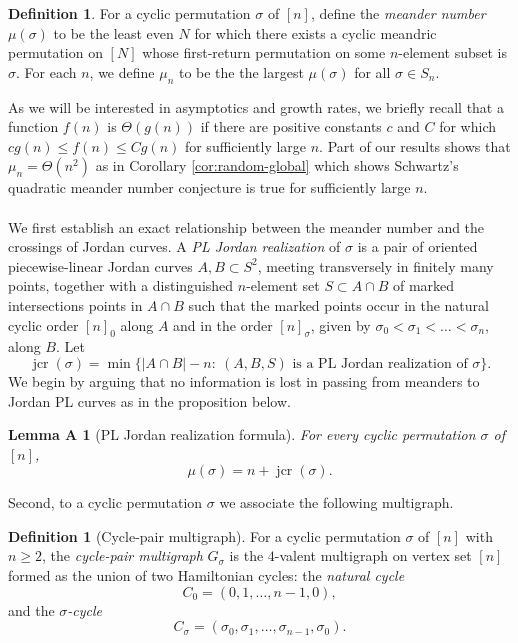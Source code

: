\documentclass[11pt,a4paper]{amsart}
\newtheorem*{mainformula}{Lemma A}
\theoremstyle{definition}
\newtheorem{definition}[theorem]{Definition}
\theoremstyle{remark}
\DeclareMathOperator{\jcr}{jcr}
\begin{document}
\begin{definition}\label{def:meander_number}
For a cyclic permutation $\sigma$ of $[n]$, define the \emph{meander number} $\mu(\sigma)$ to be the least even $N$ for which there exists a cyclic meandric permutation on $[N]$ whose first-return permutation on some $n$-element subset is $\sigma$.  For each $n$, we define $\mu_{n}$ to be the the largest $\mu(\sigma)$ for all $\sigma \in S_{n}$. 
\end{definition}
%
As we will be interested in asymptotics and growth rates, we briefly recall that a function $f(n)$ is $\Theta(g(n))$ if there are positive constants $c$ and $C$ for which $c g(n) \leq f(n) \leq C g(n)$ for sufficiently large $n$.  Part of our results shows that $\mu_{n} = \Theta(n^{2})$ as in Corollary \ref{cor:random-global} which shows Schwartz's quadratic meander number conjecture is true for sufficiently large $n$.  
\\
\\
We first establish an exact relationship between the meander number and the crossings of Jordan curves.  A \emph{PL Jordan realization} of $\sigma$ is a
pair of oriented piecewise-linear Jordan curves $A,B\subset S^2$, meeting
transversely in finitely many points, together with a distinguished $n$-element set
$S\subset A\cap B$ of marked intersections points in $A\cap B$ such that the marked points occur
in the natural cyclic order $[n]_{0}$ along $A$ and in the order $[n]_{\sigma}$, given by $\sigma_{0} < \sigma_{1} < \hdots < \sigma_{n}$, along $B$.  Let
\begin{equation*}
        \jcr(\sigma)=
        \min\{|A\cap B|-n:\ (A,B,S)\text{ is a PL Jordan realization of }\sigma\}.
\end{equation*}
We begin by arguing that no information is lost in passing from meanders to Jordan PL curves as in the proposition below.
\begin{mainformula}[PL Jordan realization formula]
For every cyclic permutation $\sigma$ of $[n]$,
\begin{equation*}
        \mu(\sigma)=n+\jcr(\sigma).
\end{equation*}
\end{mainformula}



Second, to a cyclic permutation $\sigma$ we associate the following multigraph.
\begin{definition}[Cycle-pair multigraph]\label{def:cpmg}
For a cyclic permutation $\sigma$ of $[n]$ with $n\ge 2$, the \emph{cycle-pair
multigraph} $G_{\sigma}$ is the $4$-valent multigraph on vertex set $[n]$ formed as the union of
two Hamiltonian cycles: the \emph{natural cycle}
\begin{equation*}
        C_0=(0,1,\ldots,n-1,0),
\end{equation*}
and the \emph{$\sigma$-cycle}
\begin{equation*}
        C_\sigma=(\sigma_0,\sigma_1,\ldots,\sigma_{n-1},\sigma_0).
\end{equation*}
\end{definition}
\end{document}
